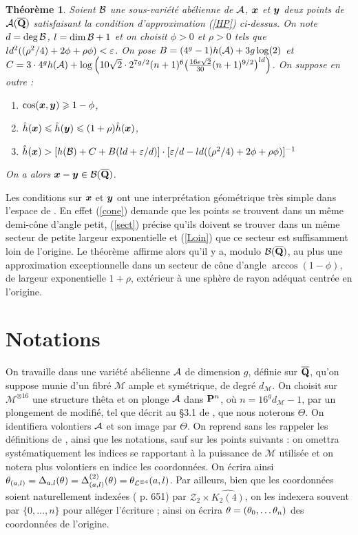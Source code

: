 \documentclass[11pt, twoside, a4paper]{article}
\newtheorem{thm}{Théorème} \newtheorem{prop}[thm]{Proposition} \newtheorem{lem}[thm]{Lemme} \newtheorem{coro}[thm]{Corollaire} \newtheorem{fait}[thm]{Fait}
\theoremstyle{remark}
\begin{document}
\begin{thm} \label{Mumford}
 Soient $\mathcal B$ une sous-variété abélienne de $\mathcal A$, $\boldsymbol{x}$ et $\boldsymbol{y}$ deux points de $\mathcal A(\overline{\mathbf{Q}})$ satisfaisant la condition d'approximation (\ref{HP}) ci-dessus. On note $d = \deg \mathcal B$, $l = \dim\mathcal B + 1$ et on choisit $\phi > 0$ et $\rho > 0$ tels que $ld^2((\rho^2/4) + 2\phi + \rho\phi)< \varepsilon$. On pose $B = (4^g-1)h(\mathcal A) + 3g\log(2)$ et $C = 3\cdot4^gh(\mathcal A) + \log\Big( 10\sqrt2\cdot 2^{7g/2} (n+1)^6\big(\frac{16e\sqrt 2}{30}(n+1)^{9/2}\big)^{ld}\Big)$. On suppose en outre :
 \begin{enumerate}
  \item $\cos(\boldsymbol{x},\boldsymbol{y}) \geqslant 1-\phi$, \label{cone}
  \item $\smash{\hat h}(\boldsymbol{x}) \leqslant \smash{\hat h}(\boldsymbol{y}) \leqslant (1+\rho)\smash{\hat h}(\boldsymbol{x})$, \label{sect}
  \item $\smash{\hat h}(\boldsymbol{x}) > [h(\mathcal B) + C + B(ld + \varepsilon/d)] \cdot [\varepsilon/d - ld((\rho^2/4) + 2\phi + \rho\phi)]^{-1}$\label{Loin}
  \end{enumerate}
 On a alors $\boldsymbol{x} - \boldsymbol{y} \in \mathcal B(\overline{\mathbf{Q}})$.
\end{thm}

Les conditions sur $\boldsymbol{x}$ et $\boldsymbol{y}$ ont une interprétation géométrique très simple dans l'espace de . En effet (\ref{cone}) demande que les points se trouvent dans un même demi-cône d'angle petit, (\ref{sect}) précise qu'ils doivent se trouver dans un même secteur de petite largeur exponentielle et (\ref{Loin}) que ce secteur est suffisamment loin de l'origine. Le théorème~affirme alors qu'il y a, modulo $\mathcal B(\overline{\mathbf{Q}})$, au plus une approximation exceptionnelle dans un secteur de cône d'angle $\arccos(1-\phi)$, de largeur exponentielle $1+\rho$, extérieur à une sphère de rayon adéquat centrée en l'origine.

	\section{Notations}

On travaille dans une variété abélienne $\mathcal A$ de dimension $g$, définie sur $\overline{\mathbf{Q}}$, qu'on suppose munie d'un fibré $\mathcal{M}$ ample et symétrique, de degré $d_\mathcal{M}$. On choisit sur $\mathcal{M}^{\otimes 16}$ une structure thêta et on plonge $\mathcal A$ dans $\mathbf{P}^n$, où $n=16^g d_\mathcal{M} - 1$, par un plongement de  modifié, tel que décrit au §3.1 de \cite{daphi}, que nous noterons $\Theta$. On identifiera volontiers $\mathcal A$ et son image par $\Theta$. On reprend sans les rappeler les définitions de , ainsi que les notations, sauf sur les points suivants : on omettra systématiquement les indices se rapportant à la puissance de $\mathcal{M}$ utilisée et on notera plus volontiers en indice les coordonnées. On écrira ainsi $\theta_{(a, l)} = \Delta_{a, l}(\theta)  = \Delta_{(a, l)}^{(2)}(\theta) = \theta_{\mathcal{L}^{\otimes 4}}(a, l)$. Par ailleurs, bien que les coordonnées soient naturellement indexées ( p. 651) par $\mathcal{Z}_2 \times \widehat{K_2(4)}$, on les indexera souvent par $\{0, \dots, n\}$ pour alléger l'écriture ; ainsi on écrira $\theta = (\theta_0, \dots \theta_n)$ des coordonnées de l'origine.
\end{document}
